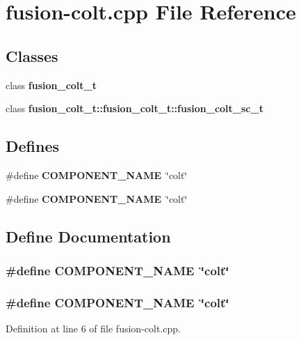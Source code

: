 \section{fusion-colt.cpp File Reference}
\label{fusion-colt_8cpp}
\subsection*{Classes}
\begin{CompactItemize}
\item 
class {\bf fusion\_\-colt\_\-t}
\item 
class {\bf fusion\_\-colt\_\-t::fusion\_\-colt\_\-t::fusion\_\-colt\_\-sc\_\-t}
\end{CompactItemize}
\subsection*{Defines}
\begin{CompactItemize}
\item 
\#define {\bf COMPONENT\_\-NAME}~\char`\"{}colt\char`\"{}
\item 
\#define {\bf COMPONENT\_\-NAME}~\char`\"{}colt\char`\"{}
\end{CompactItemize}


\subsection{Define Documentation}
\subsubsection[{COMPONENT\_\-NAME}]{\setlength{\rightskip}{0pt plus 5cm}\#define COMPONENT\_\-NAME~\char`\"{}colt\char`\"{}}\label{zesto-bpred_8cpp_9146ade7ce24e3db226a973a59063892}


\subsubsection[{COMPONENT\_\-NAME}]{\setlength{\rightskip}{0pt plus 5cm}\#define COMPONENT\_\-NAME~\char`\"{}colt\char`\"{}}\label{fusion-colt_8cpp_9146ade7ce24e3db226a973a59063892}




Definition at line 6 of file fusion-colt.cpp.